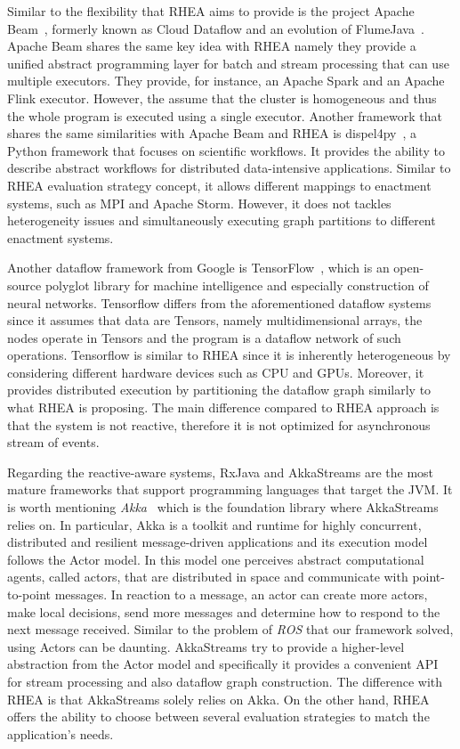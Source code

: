 \documentclass[sigplan,screen,review,anonymous]{acmart}
\begin{document}
Similar to the flexibility that \textsc{RHEA} aims to provide is the project
Apache Beam~\cite{DBLP:journals/pvldb/AkidauBCCFLMMPS15}, formerly known as Cloud Dataflow and an evolution of FlumeJava~\cite{flumejava}.
Apache Beam shares the same key idea with \textsc{RHEA} namely they provide a
unified abstract programming layer for batch and stream processing that can use
multiple executors. They provide, for instance, an Apache Spark and an Apache Flink
executor. However, the assume that the cluster is homogeneous and thus the whole
program is executed using a single executor. Another framework that shares the
same similarities with Apache Beam and RHEA is dispel4py~\cite{dispel4py}, a Python
framework that focuses on scientific workflows. It provides the ability
to describe abstract workflows for distributed data-intensive applications.
Similar to \textsc{RHEA} evaluation strategy concept, it allows different mappings
to enactment systems, such as MPI and Apache Storm. However, it does not tackles
heterogeneity issues and simultaneously executing graph partitions to different
enactment systems.

Another dataflow framework from Google is TensorFlow~\cite{tensorflow},
which is an open-source polyglot library for machine intelligence and especially
construction of neural networks. Tensorflow differs from the aforementioned dataflow
systems since it assumes that data are Tensors, namely multidimensional arrays,
the nodes operate in Tensors and the program is a dataflow network of such operations.
Tensorflow is similar to \textsc{RHEA} since it is inherently heterogeneous by
considering different hardware devices such as CPU and GPUs. Moreover, it provides
distributed execution by partitioning the dataflow graph similarly to what \textsc{RHEA}
is proposing. The main difference compared to \textsc{RHEA} approach is that the
system is not reactive, therefore it is not optimized for asynchronous stream of
events.

Regarding the reactive-aware systems, RxJava and AkkaStreams are the most mature
frameworks that support programming languages that target the JVM. It is worth
mentioning \textit{Akka}~ which is the foundation library
where AkkaStreams relies on. In particular, Akka is a toolkit and runtime for highly
concurrent, distributed and resilient message-driven applications and its execution
model follows the Actor model. In this model one perceives abstract computational
agents, called actors, that are distributed in space and communicate with
point-to-point messages. In reaction to a message, an actor can create more actors,
make local decisions, send more messages and determine how to respond to the next
message received. Similar to the problem of \textit{ROS} that our framework solved,
using Actors can be daunting. AkkaStreams try to provide a higher-level abstraction
from the Actor model and specifically it provides a convenient API for stream
processing and also dataflow graph construction.
The difference with \textsc{RHEA} is that AkkaStreams solely relies on Akka. On the
other hand, \textsc{RHEA} offers the ability to choose between several
evaluation strategies to match the application's needs.
\end{document}
